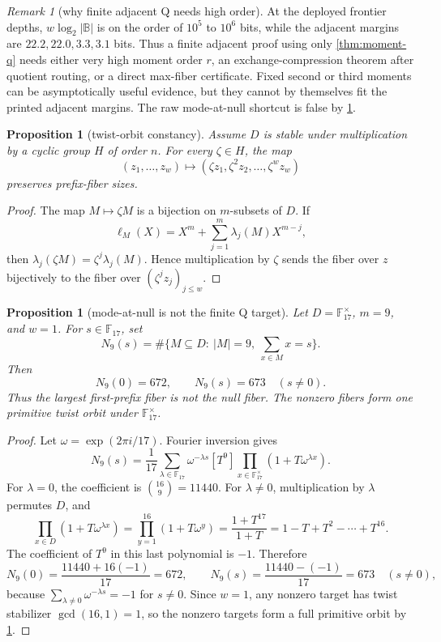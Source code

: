 \documentclass[a4paper,11pt]{amsart}
\newtheorem{proposition}[theorem]{Proposition}
\theoremstyle{remark}
\newtheorem{remark}[theorem]{Remark}
\newcommand{\F}{\mathbb F}
\newcommand{\B}{\mathbb B}
\begin{document}
\begin{remark}[why finite adjacent Q needs high order]\label{rem:finite-moment-order}
At the deployed frontier depths, \(w\log_2|\B|\) is on the order of \(10^5\) to \(10^6\) bits, while the adjacent margins are \(22.2,22.0,3.3,3.1\) bits.  Thus a finite adjacent proof using only \cref{thm:moment-q} needs either very high moment order \(r\), an exchange-compression theorem after quotient routing, or a direct max-fiber certificate.  Fixed second or third moments can be asymptotically useful evidence, but they cannot by themselves fit the printed adjacent margins.  The raw mode-at-null shortcut is false by \cref{prop:mode-null-false}.
\end{remark}

\begin{proposition}[twist-orbit constancy]\label{prop:twist-orbit}
Assume \(D\) is stable under multiplication by a cyclic group \(H\) of order \(n\).  For every \(\zeta\in H\), the map
\[
        (z_1,\ldots,z_w)\longmapsto(\zeta z_1,\zeta^2z_2,\ldots,\zeta^wz_w)
\]
preserves prefix-fiber sizes.
\end{proposition}

\begin{proof}
The map \(M\mapsto \zeta M\) is a bijection on \(m\)-subsets of \(D\).  If
\[
        \ell_M(X)=X^m+\sum_{j=1}^m \lambda_j(M)X^{m-j},
\]
then \(\lambda_j(\zeta M)=\zeta^j\lambda_j(M)\).  Hence multiplication by \(\zeta\) sends the fiber over \(z\) bijectively to the fiber over \((\zeta^j z_j)_{j\le w}\).
\end{proof}

\begin{proposition}[mode-at-null is not the finite Q target]\label{prop:mode-null-false}
Let \(D=\F_{17}^{\times}\), \(m=9\), and \(w=1\).  For \(s\in\F_{17}\), set
\[
        N_9(s)=\#\{M\subseteq D:\ |M|=9,\ \sum_{x\in M}x=s\}.
\]
Then
\[
        N_9(0)=672,
        \qquad
        N_9(s)=673\quad(s\ne0).
\]
Thus the largest first-prefix fiber is not the null fiber.  The nonzero fibers form one primitive twist orbit under \(\F_{17}^{\times}\).
\end{proposition}

\begin{proof}
Let \(\omega=\exp(2\pi i/17)\).  Fourier inversion gives
\[
        N_9(s)=\frac{1}{17}\sum_{\lambda\in\F_{17}}\omega^{-\lambda s}
        [T^9]\prod_{x\in\F_{17}^{\times}}(1+T\omega^{\lambda x}).
\]
For \(\lambda=0\), the coefficient is \(\binom{16}{9}=11440\).  For \(\lambda\ne0\), multiplication by \(\lambda\) permutes \(D\), and
\[
        \prod_{x\in D}(1+T\omega^{\lambda x})
        =
        \prod_{y=1}^{16}(1+T\omega^y)
        =\frac{1+T^{17}}{1+T}
        =1-T+T^2-\cdots+T^{16}.
\]
The coefficient of \(T^9\) in this last polynomial is \(-1\).  Therefore
\[
        N_9(0)=\frac{11440+16(-1)}{17}=672,
        \qquad
        N_9(s)=\frac{11440-(-1)}{17}=673
        \quad(s\ne0),
\]
because \(\sum_{\lambda\ne0}\omega^{-\lambda s}=-1\) for \(s\ne0\).  Since \(w=1\), any nonzero target has twist stabilizer \(\gcd(16,1)=1\), so the nonzero targets form a full primitive orbit by \cref{prop:twist-orbit}.
\end{proof}
\end{document}
